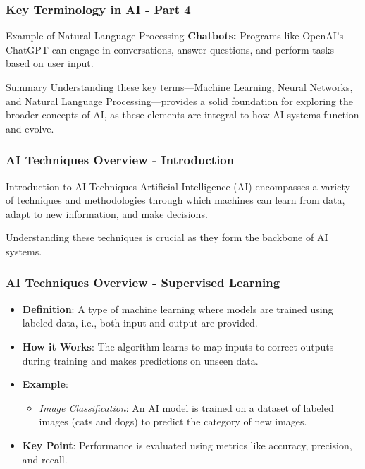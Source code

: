 \documentclass{beamer}
\begin{document}
\begin{frame}[fragile]
    \frametitle{Key Terminology in AI - Part 4}
    \begin{block}{Example of Natural Language Processing}
        \textbf{Chatbots:}  
        Programs like OpenAI's ChatGPT can engage in conversations, answer questions, and perform tasks based on user input.
    \end{block}

    \begin{block}{Summary}
        Understanding these key terms—Machine Learning, Neural Networks, and Natural Language Processing—provides a solid foundation for exploring the broader concepts of AI, as these elements are integral to how AI systems function and evolve.
    \end{block}
\end{frame}

\begin{frame}[fragile]
    \frametitle{AI Techniques Overview - Introduction}
    \begin{block}{Introduction to AI Techniques}
        Artificial Intelligence (AI) encompasses a variety of techniques and methodologies through which machines can learn from data, adapt to new information, and make decisions. 
    \end{block}
    Understanding these techniques is crucial as they form the backbone of AI systems.
\end{frame}

\begin{frame}[fragile]
    \frametitle{AI Techniques Overview - Supervised Learning}
    \begin{itemize}
        \item \textbf{Definition}: A type of machine learning where models are trained using labeled data, i.e., both input and output are provided.
        \item \textbf{How it Works}: The algorithm learns to map inputs to correct outputs during training and makes predictions on unseen data.
        \item \textbf{Example}: 
        \begin{itemize}
            \item \textit{Image Classification}: An AI model is trained on a dataset of labeled images (cats and dogs) to predict the category of new images.
        \end{itemize}
        \item \textbf{Key Point}: Performance is evaluated using metrics like accuracy, precision, and recall.
    \end{itemize}
\end{frame}
\end{document}
